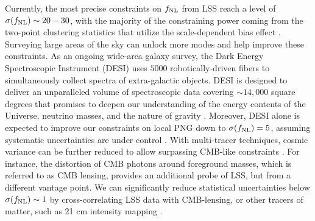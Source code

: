 Currently, the most precise constraints on $f_{\rm NL}$ from LSS reach a level of $\sigma(f_{\rm NL}) \sim 20-30$, with the majority of the constraining power coming from the two-point clustering statistics that utilize the scale-dependent bias effect \citep{2019JCAP...09..010C, mueller2022primordial, 2022PhRvD.106d3506C, 2022arXiv220111518D}. Surveying large areas of the sky can unlock more modes and help improve these constraints. As an ongoing wide-area galaxy survey, the Dark Energy Spectroscopic Instrument (DESI) uses $5000$ robotically-driven fibers to simultaneously collect spectra of extra-galactic objects. DESI is designed to deliver an unparalleled volume of spectroscopic data covering $\sim 14,000$ square degrees that promises to deepen our understanding of the energy contents of the Universe, neutrino masses, and the nature of gravity \citep{aghamousa2016desi}. Moreover, DESI alone is expected to improve our constraints on local PNG down to $\sigma(f_{\rm NL})=5$, assuming systematic uncertainties are under control \citep{aghamousa2016desi}. With multi-tracer techniques, cosmic variance can be further reduced to allow surpassing CMB-like constraints \citep{2015ApJ...814..145A}. For instance, the distortion of CMB photons around foreground masses, which is referred to as CMB lensing, provides an additional probe of LSS, but from a different vantage point. We can significantly reduce statistical uncertainties below $\sigma(f_{\rm NL})\sim 1$ by cross-correlating LSS data with CMB-lensing, or other tracers of matter, such as 21 cm intensity mapping  \citep[see, e.g.,][]{schmittfull2018PhRvD, Heinrich2022AAS...24020203H, 2023arXiv230102406J, 2023arXiv230308901S}.  
 

